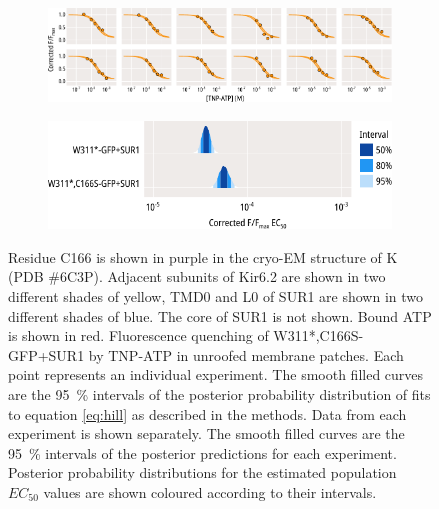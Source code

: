 \begin{figure}[h]
\begin{subfigure}[t]{0.45\textwidth}
	\end{subfigure}
	\vfill
	\begin{subfigure}[t]{0.9\textwidth}
		\caption{}\label{ch5fig:c166s_indfits}
		\centering
		\includegraphics[width=\textwidth]{c166s_3.pdf}
	\end{subfigure}
	\vfill
	\begin{subfigure}[t]{0.7\textwidth}
		\caption{}\label{ch5fig:c166s_params}
		\centering
		\includegraphics[width=\textwidth]{c166s_4.pdf}
	\end{subfigure}
	\caption[C166S does not alter nucleotide binding]{
	 Residue C166 is shown in purple in the cryo-EM structure of K\ATP{} (PDB \#6C3P).
	Adjacent subunits of Kir6.2 are shown in two different shades of yellow, TMD0 and L0 of SUR1 are shown in two different shades of blue.
	The core of SUR1 is not shown.
	Bound ATP is shown in red.
	 Fluorescence quenching of W311*,C166S-GFP+SUR1 by TNP-ATP in unroofed membrane patches.
	Each point represents an individual experiment.
	The smooth filled curves are the \SI{95}{\percent} intervals of the posterior probability distribution of fits to equation \ref{eq:hill} as described in the methods.
	 Data from each experiment is shown separately.
	The smooth filled curves are the \SI{95}{\percent} intervals of the posterior predictions for each experiment.
	 Posterior probability distributions for the estimated population $EC_{50}$ values are shown coloured according to their intervals.
	}\label{ch5fig:c166s_1}
\end{figure}

